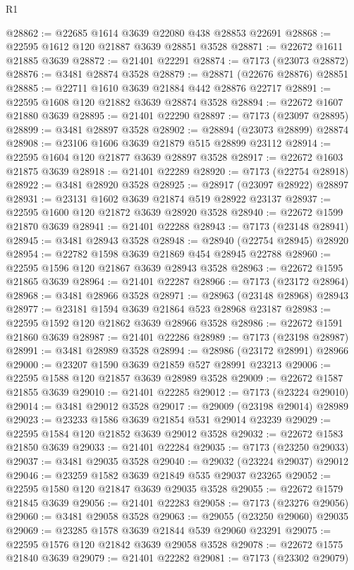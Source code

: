 \begin{lexlean}{R1}
\begin{coremodule}
@28862 := @22685 @1614 @3639 @22080 @438 @28853 @22691
@28868 := @22595 @1612 @120 @21887 @3639 @28851 @3528
@28871 := @22672 @1611 @21885 @3639
@28872 := @21401 @22291
@28874 := @7173 (@23073 @28872)
@28876 := @3481 @28874 @3528
@28879 := @28871 (@22676 @28876) @28851
@28885 := @22711 @1610 @3639 @21884 @442 @28876 @22717
@28891 := @22595 @1608 @120 @21882 @3639 @28874 @3528
@28894 := @22672 @1607 @21880 @3639
@28895 := @21401 @22290
@28897 := @7173 (@23097 @28895)
@28899 := @3481 @28897 @3528
@28902 := @28894 (@23073 @28899) @28874
@28908 := @23106 @1606 @3639 @21879 @515 @28899 @23112
@28914 := @22595 @1604 @120 @21877 @3639 @28897 @3528
@28917 := @22672 @1603 @21875 @3639
@28918 := @21401 @22289
@28920 := @7173 (@22754 @28918)
@28922 := @3481 @28920 @3528
@28925 := @28917 (@23097 @28922) @28897
@28931 := @23131 @1602 @3639 @21874 @519 @28922 @23137
@28937 := @22595 @1600 @120 @21872 @3639 @28920 @3528
@28940 := @22672 @1599 @21870 @3639
@28941 := @21401 @22288
@28943 := @7173 (@23148 @28941)
@28945 := @3481 @28943 @3528
@28948 := @28940 (@22754 @28945) @28920
@28954 := @22782 @1598 @3639 @21869 @454 @28945 @22788
@28960 := @22595 @1596 @120 @21867 @3639 @28943 @3528
@28963 := @22672 @1595 @21865 @3639
@28964 := @21401 @22287
@28966 := @7173 (@23172 @28964)
@28968 := @3481 @28966 @3528
@28971 := @28963 (@23148 @28968) @28943
@28977 := @23181 @1594 @3639 @21864 @523 @28968 @23187
@28983 := @22595 @1592 @120 @21862 @3639 @28966 @3528
@28986 := @22672 @1591 @21860 @3639
@28987 := @21401 @22286
@28989 := @7173 (@23198 @28987)
@28991 := @3481 @28989 @3528
@28994 := @28986 (@23172 @28991) @28966
@29000 := @23207 @1590 @3639 @21859 @527 @28991 @23213
@29006 := @22595 @1588 @120 @21857 @3639 @28989 @3528
@29009 := @22672 @1587 @21855 @3639
@29010 := @21401 @22285
@29012 := @7173 (@23224 @29010)
@29014 := @3481 @29012 @3528
@29017 := @29009 (@23198 @29014) @28989
@29023 := @23233 @1586 @3639 @21854 @531 @29014 @23239
@29029 := @22595 @1584 @120 @21852 @3639 @29012 @3528
@29032 := @22672 @1583 @21850 @3639
@29033 := @21401 @22284
@29035 := @7173 (@23250 @29033)
@29037 := @3481 @29035 @3528
@29040 := @29032 (@23224 @29037) @29012
@29046 := @23259 @1582 @3639 @21849 @535 @29037 @23265
@29052 := @22595 @1580 @120 @21847 @3639 @29035 @3528
@29055 := @22672 @1579 @21845 @3639
@29056 := @21401 @22283
@29058 := @7173 (@23276 @29056)
@29060 := @3481 @29058 @3528
@29063 := @29055 (@23250 @29060) @29035
@29069 := @23285 @1578 @3639 @21844 @539 @29060 @23291
@29075 := @22595 @1576 @120 @21842 @3639 @29058 @3528
@29078 := @22672 @1575 @21840 @3639
@29079 := @21401 @22282
@29081 := @7173 (@23302 @29079)

\end{coremodule}
\end{lexlean}
